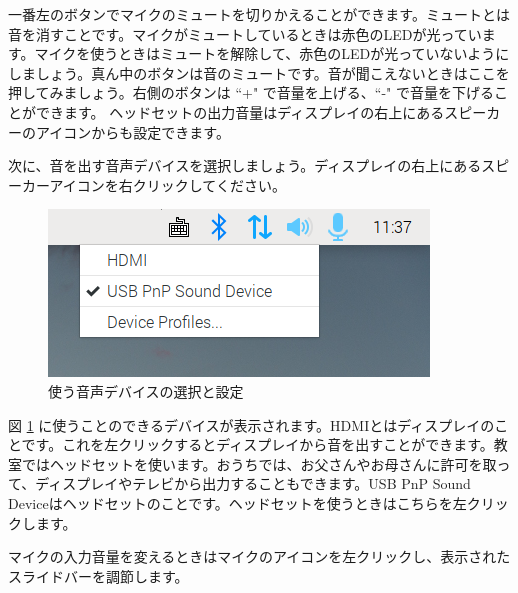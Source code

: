 一番左のボタンでマイクのミュートを切りかえることができます。ミュートとは音を消すことです。マイクがミュートしているときは赤色のLEDが光っています。マイクを使うときはミュートを解除して、赤色のLEDが光っていないようにしましょう。真ん中のボタンは音のミュートです。音が聞こえないときはここを押してみましょう。右側のボタンは ``+" で音量を上げる、``-" で音量を下げることができます。
ヘッドセットの出力音量はディスプレイの右上にあるスピーカーのアイコンからも設定できます。

次に、音を出す音声デバイスを選択しましょう。ディスプレイの右上にあるスピーカーアイコンを右クリックしてください。

\begin{figure}[H]
\begin{center}
    \includegraphics[width=\linewidth]{images/select_sink.png}
    \caption{使う音声デバイスの選択と設定}
    \label{使う音声デバイスの選択と設定}
\end{center}
\end{figure}

図 \ref{使う音声デバイスの選択と設定} に使うことのできるデバイスが表示されます。HDMIとはディスプレイのことです。これを左クリックするとディスプレイから音を出すことができます。教室ではヘッドセットを使います。おうちでは、お父さんやお母さんに許可を取って、ディスプレイやテレビから出力することもできます。USB PnP Sound Deviceはヘッドセットのことです。ヘッドセットを使うときはこちらを左クリックします。

マイクの入力音量を変えるときはマイクのアイコンを左クリックし、表示されたスライドバーを調節します。

